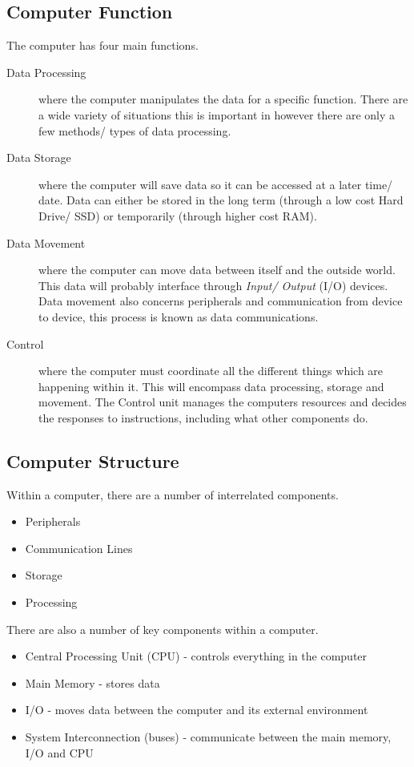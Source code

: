 \subsection{Computer Function}
The computer has four main functions.
\begin{description}
    \item[Data Processing] where the computer manipulates the data for a specific function. There are a wide variety of situations this is important in however there are only a few methods/ types of data processing. 
    \item[Data Storage] where the computer will save data so it can be accessed at a later time/ date. Data can either be stored in the long term (through a low cost Hard Drive/ SSD) or temporarily (through higher cost RAM). 
    \item[Data Movement] where the computer can move data between itself and the outside world. This data will probably interface through \textit{Input/ Output} (I/O) devices. Data movement also concerns peripherals and communication from device to device, this process is known as data communications.
    \item[Control] where the computer must coordinate all the different things which are happening within it. This will encompass data processing, storage and movement. The Control unit manages the computers resources and decides the responses to instructions, including what other components do. 
\end{description}

\subsection{Computer Structure}
Within a computer, there are a number of interrelated components.
\begin{itemize}
    \item Peripherals
    \item Communication Lines
    \item Storage
    \item Processing
\end{itemize}
There are also a number of key components within a computer.
\begin{itemize}
    \item Central Processing Unit (CPU) - controls everything in the computer
    \item Main Memory - stores data
    \item I/O - moves data between the computer and its external environment
    \item System Interconnection (buses) - communicate between the main memory, I/O and CPU
\end{itemize}

